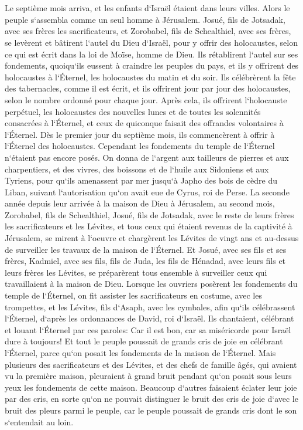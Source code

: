 \chapter{}

\verse Le septième mois arriva, et les enfants d`Israël étaient dans leurs villes. Alors le peuple s`assembla comme un seul homme à Jérusalem. 
\verse Josué, fils de Jotsadak, avec ses frères les sacrificateurs, et Zorobabel, fils de Schealthiel, avec ses frères, se levèrent et bâtirent l`autel du Dieu d`Israël, pour y offrir des holocaustes, selon ce qui est écrit dans la loi de Moïse, homme de Dieu. 
\verse Ils rétablirent l`autel sur ses fondements, quoiqu`ils eussent à craindre les peuples du pays, et ils y offrirent des holocaustes à l`Éternel, les holocaustes du matin et du soir. 
\verse Ils célébrèrent la fête des tabernacles, comme il est écrit, et ils offrirent jour par jour des holocaustes, selon le nombre ordonné pour chaque jour. 
\verse Après cela, ils offrirent l`holocauste perpétuel, les holocaustes des nouvelles lunes et de toutes les solennités consacrées à l`Éternel, et ceux de quiconque faisait des offrandes volontaires à l`Éternel. 
\verse Dès le premier jour du septième mois, ils commencèrent à offrir à l`Éternel des holocaustes. Cependant les fondements du temple de l`Éternel n`étaient pas encore posés. 
\verse On donna de l`argent aux tailleurs de pierres et aux charpentiers, et des vivres, des boissons et de l`huile aux Sidoniens et aux Tyriens, pour qu`ils amenassent par mer jusqu`à Japho des bois de cèdre du Liban, suivant l`autorisation qu`on avait eue de Cyrus, roi de Perse. 
\verse La seconde année depuis leur arrivée à la maison de Dieu à Jérusalem, au second mois, Zorobabel, fils de Schealthiel, Josué, fils de Jotsadak, avec le reste de leurs frères les sacrificateurs et les Lévites, et tous ceux qui étaient revenus de la captivité à Jérusalem, se mirent à l`oeuvre et chargèrent les Lévites de vingt ans et au-dessus de surveiller les travaux de la maison de l`Éternel. 
\verse Et Josué, avec ses fils et ses frères, Kadmiel, avec ses fils, fils de Juda, les fils de Hénadad, avec leurs fils et leurs frères les Lévites, se préparèrent tous ensemble à surveiller ceux qui travaillaient à la maison de Dieu. 
\verse Lorsque les ouvriers posèrent les fondements du temple de l`Éternel, on fit assister les sacrificateurs en costume, avec les trompettes, et les Lévites, fils d`Asaph, avec les cymbales, afin qu`ils célébrassent l`Éternel, d`après les ordonnances de David, roi d`Israël. 
\verse Ils chantaient, célébrant et louant l`Éternel par ces paroles: Car il est bon, car sa miséricorde pour Israël dure à toujours! Et tout le peuple poussait de grands cris de joie en célébrant l`Éternel, parce qu`on posait les fondements de la maison de l`Éternel. 
\verse Mais plusieurs des sacrificateurs et des Lévites, et des chefs de famille âgés, qui avaient vu la première maison, pleuraient à grand bruit pendant qu`on posait sous leurs yeux les fondements de cette maison. Beaucoup d`autres faisaient éclater leur joie par des cris, 
\verse en sorte qu`on ne pouvait distinguer le bruit des cris de joie d`avec le bruit des pleurs parmi le peuple, car le peuple poussait de grands cris dont le son s`entendait au loin. 

